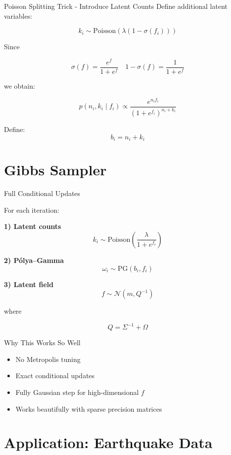 \documentclass[11pt]{beamer}
\begin{document}

\begin{frame}{Poisson Splitting Trick - Introduce Latent Counts}
Define additional latent variables:

\[
k_i \sim \text{Poisson}(\lambda(1-\sigma(f_i)))
\]

Since

\[
\sigma(f) = \frac{e^f}{1+e^f}
\quad
1-\sigma(f)=\frac{1}{1+e^f}
\]

we obtain:

\[
p(n_i,k_i \mid f_i)
\propto
\frac{e^{n_i f_i}}{(1+e^{f_i})^{n_i+k_i}}
\]

Define:
\[
b_i = n_i + k_i
\]
\end{frame}



\section{Gibbs Sampler}

\begin{frame}{Full Conditional Updates}

For each iteration:

\textbf{1) Latent counts}
\[
k_i \sim \text{Poisson}\left(\frac{\lambda}{1+e^{f_i}}\right)
\]

\textbf{2) Pólya–Gamma}
\[
\omega_i \sim \text{PG}(b_i,f_i)
\]

\textbf{3) Latent field}
\[
f \sim \mathcal{N}(m,Q^{-1})
\]

where

\[
Q = \Sigma^{-1} + \Omega
\]
\end{frame}

\begin{frame}{Why This Works So Well}
\begin{itemize}
\item No Metropolis tuning
\item Exact conditional updates
\item Fully Gaussian step for high-dimensional $f$
\item Works beautifully with sparse precision matrices
\end{itemize}
\end{frame}


\section{Application: Earthquake Data}
\end{document}
